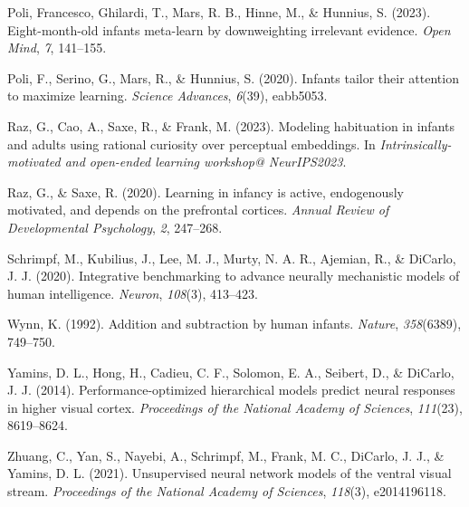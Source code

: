 \documentclass[10pt, letterpaper]{article}
\newenvironment{CSLReferences}%
  {}%
  {\par}
\begin{document}
\begin{CSLReferences}{1}{0}
\leavevmode{}%
Poli, Francesco, Ghilardi, T., Mars, R. B., Hinne, M., \& Hunnius, S.
(2023). Eight-month-old infants meta-learn by downweighting irrelevant
evidence. \emph{Open Mind}, \emph{7}, 141--155.

\leavevmode{}%
Poli, F., Serino, G., Mars, R., \& Hunnius, S. (2020). Infants tailor
their attention to maximize learning. \emph{Science Advances},
\emph{6}(39), eabb5053.

\leavevmode{}%
Raz, G., Cao, A., Saxe, R., \& Frank, M. (2023). Modeling habituation in
infants and adults using rational curiosity over perceptual embeddings.
In \emph{Intrinsically-motivated and open-ended learning workshop@
NeurIPS2023}.

\leavevmode{}%
Raz, G., \& Saxe, R. (2020). Learning in infancy is active, endogenously
motivated, and depends on the prefrontal cortices. \emph{Annual Review
of Developmental Psychology}, \emph{2}, 247--268.

\leavevmode{}%
Schrimpf, M., Kubilius, J., Lee, M. J., Murty, N. A. R., Ajemian, R., \&
DiCarlo, J. J. (2020). Integrative benchmarking to advance neurally
mechanistic models of human intelligence. \emph{Neuron}, \emph{108}(3),
413--423.

\leavevmode{}%
Wynn, K. (1992). Addition and subtraction by human infants.
\emph{Nature}, \emph{358}(6389), 749--750.

\leavevmode{}%
Yamins, D. L., Hong, H., Cadieu, C. F., Solomon, E. A., Seibert, D., \&
DiCarlo, J. J. (2014). Performance-optimized hierarchical models predict
neural responses in higher visual cortex. \emph{Proceedings of the
National Academy of Sciences}, \emph{111}(23), 8619--8624.

\leavevmode{}%
Zhuang, C., Yan, S., Nayebi, A., Schrimpf, M., Frank, M. C., DiCarlo, J.
J., \& Yamins, D. L. (2021). Unsupervised neural network models of the
ventral visual stream. \emph{Proceedings of the National Academy of
Sciences}, \emph{118}(3), e2014196118.

\end{CSLReferences}


\end{document}
